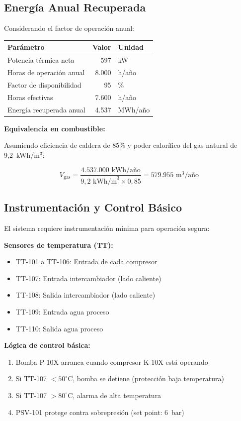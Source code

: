 \documentclass[12pt,a4paper]{article}
\begin{document}
\subsection{Energía Anual Recuperada}

Considerando el factor de operación anual:

\begin{table}[h]
\centering
\begin{tabular}{lrl}
\toprule
\textbf{Parámetro} & \textbf{Valor} & \textbf{Unidad} \\
\midrule
Potencia térmica neta & 597 & kW \\
Horas de operación anual & 8.000 & h/año \\
Factor de disponibilidad & 95 & \% \\
Horas efectivas & 7.600 & h/año \\
Energía recuperada anual & 4.537 & MWh/año \\
\bottomrule
\end{tabular}
\end{table}

\textbf{Equivalencia en combustible:}

Asumiendo eficiencia de caldera de 85\% y poder calorífico del gas natural de 9,2~kWh/m$^3$:

\begin{equation}
V_{\text{gas}} = \frac{4.537.000 \text{ kWh/año}}{9{,}2 \text{ kWh/m}^3 \times 0{,}85} = 579.955 \text{ m}^3\text{/año}
\end{equation}

\subsection{Instrumentación y Control Básico}

El sistema requiere instrumentación mínima para operación segura:

\textbf{Sensores de temperatura (TT):}
\begin{itemize}
    \item TT-101 a TT-106: Entrada de cada compresor
    \item TT-107: Entrada intercambiador (lado caliente)
    \item TT-108: Salida intercambiador (lado caliente)
    \item TT-109: Entrada agua proceso
    \item TT-110: Salida agua proceso
\end{itemize}

\textbf{Lógica de control básica:}
\begin{enumerate}
    \item Bomba P-10X arranca cuando compresor K-10X está operando
    \item Si TT-107 $< 50^\circ$C, bomba se detiene (protección baja temperatura)
    \item Si TT-107 $> 80^\circ$C, alarma de alta temperatura
    \item PSV-101 protege contra sobrepresión (set point: 6~bar)
\end{enumerate}
\end{document}
